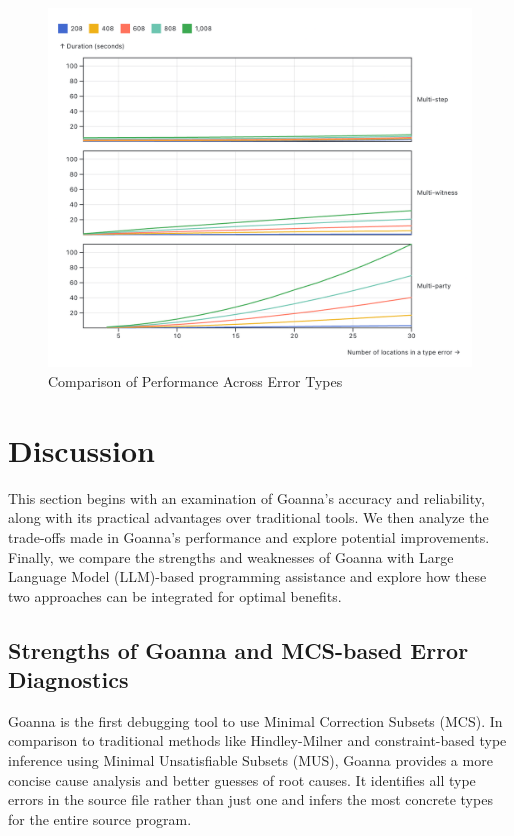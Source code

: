 \documentclass[pdflatex,sn-nature,Numbered]{sn-jnl}%
\begin{document}
\begin{figure}[ht]
    \centering
    \includegraphics[width=\linewidth]{images/compare-time.png}
    \caption{Comparison of Performance Across Error Types}
    \label{fig:compare-time}
\end{figure}


\section{Discussion} \label{sec:discussion}

This section begins with an examination of Goanna's accuracy and reliability, along with its practical advantages over traditional tools. We then analyze the trade-offs made in Goanna's performance and explore potential improvements. Finally, we compare the strengths and weaknesses of Goanna with Large Language Model (LLM)-based programming assistance and explore how these two approaches can be integrated for optimal benefits.

\subsection{Strengths of Goanna and MCS-based Error Diagnostics}

Goanna is the first debugging tool to use Minimal Correction Subsets (MCS). In comparison to traditional methods like Hindley-Milner and constraint-based type inference using Minimal Unsatisfiable Subsets (MUS), Goanna provides a more concise cause analysis and better guesses of root causes. It identifies all type errors in the source file rather than just one and infers the most concrete types for the entire source program.
\end{document}
